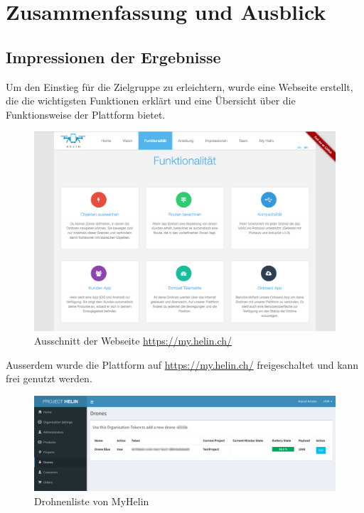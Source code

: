 \chapter{Zusammenfassung und Ausblick}

\section{Impressionen der Ergebnisse}

Um den Einstieg für die Zielgruppe zu erleichtern, wurde eine Webseite erstellt, die die wichtigsten Funktionen erklärt und eine Übersicht über die Funktionsweise der Plattform bietet.

\begin{figure}[H]
	\centering
	\includegraphics[width=1\textwidth] {images/website.png}
	\caption{Ausschnitt der Webseite \url{https://my.helin.ch/}}
\end{figure}
\newpage

Ausserdem wurde die Plattform auf \url{https://my.helin.ch/} freigeschaltet und kann frei genutzt werden.

\begin{figure}[H]
	\centering
	\includegraphics[width=1.0\textwidth] {images/myhelin.png}
	\caption{Drohnenliste von MyHelin}
\end{figure}

